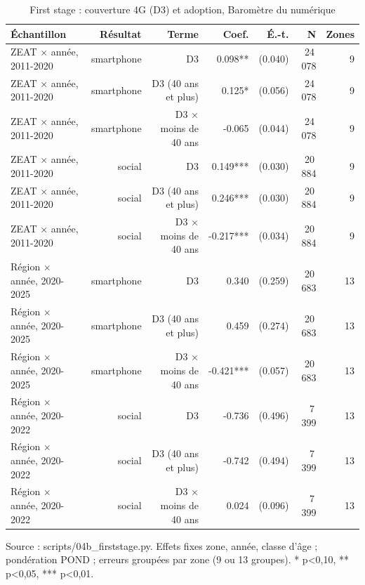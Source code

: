 \begin{table}[htbp]\centering
\begin{threeparttable}
\caption{First stage : couverture 4G (D3) et adoption, Baromètre du numérique}\label{tab:firststage}
\small
\begin{tabular}{lrrrrrr}
\toprule
Échantillon & Résultat & Terme & Coef. & É.-t. & N & Zones \\
\midrule
ZEAT × année, 2011-2020 & smartphone & D3 & 0.098** & (0.040) & 24\,078 & 9 \\
ZEAT × année, 2011-2020 & smartphone & D3 (40 ans et plus) & 0.125* & (0.056) & 24\,078 & 9 \\
ZEAT × année, 2011-2020 & smartphone & D3 × moins de 40 ans & -0.065 & (0.044) & 24\,078 & 9 \\
ZEAT × année, 2011-2020 & social & D3 & 0.149*** & (0.030) & 20\,884 & 9 \\
ZEAT × année, 2011-2020 & social & D3 (40 ans et plus) & 0.246*** & (0.030) & 20\,884 & 9 \\
ZEAT × année, 2011-2020 & social & D3 × moins de 40 ans & -0.217*** & (0.034) & 20\,884 & 9 \\
Région × année, 2020-2025 & smartphone & D3 & 0.340 & (0.259) & 20\,683 & 13 \\
Région × année, 2020-2025 & smartphone & D3 (40 ans et plus) & 0.459 & (0.274) & 20\,683 & 13 \\
Région × année, 2020-2025 & smartphone & D3 × moins de 40 ans & -0.421*** & (0.057) & 20\,683 & 13 \\
Région × année, 2020-2022 & social & D3 & -0.736 & (0.496) & 7\,399 & 13 \\
Région × année, 2020-2022 & social & D3 (40 ans et plus) & -0.742 & (0.494) & 7\,399 & 13 \\
Région × année, 2020-2022 & social & D3 × moins de 40 ans & 0.024 & (0.096) & 7\,399 & 13 \\
\bottomrule
\end{tabular}
\begin{tablenotes}\footnotesize
\item Source : scripts/04b\_firststage.py. Effets fixes zone, année, classe d'âge ; pondération POND ; erreurs groupées par zone (9 ou 13 groupes). * p<0,10, ** p<0,05, *** p<0,01.
\end{tablenotes}
\end{threeparttable}
\end{table}
